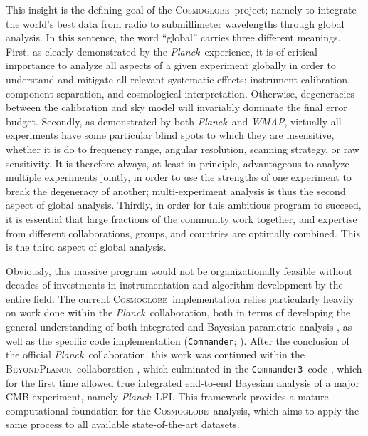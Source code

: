 \documentclass[twocolumn]{../../common/aa}
\def\WMAP{\emph{WMAP}}
\def\Planck{\emph{Planck}}
\def\commanderthree{\texttt{Commander3}}
\newcommand{\bp}{\textsc{BeyondPlanck}}
\newcommand{\cosmoglobe}{\textsc{Cosmoglobe}}
\begin{document}
This insight is the defining goal of the \cosmoglobe\ project; namely to integrate the world's best data from radio to submillimeter wavelengths through global analysis. In this sentence, the word ``global'' carries three different meanings. First, as clearly demonstrated by the \Planck\ experience, it is of critical importance to analyze all aspects of a given experiment globally in order to understand and mitigate all relevant systematic effects; instrument calibration, component separation, and cosmological interpretation. Otherwise, degeneracies between the calibration and sky model will invariably dominate the final error budget. Secondly, as demonstrated by both \Planck\ and \WMAP, virtually all experiments have some particular blind spots to which they are insensitive, whether it is do to frequency range, angular resolution, scanning strategy, or raw sensitivity. It is therefore always, at least in principle, advantageous to analyze multiple experiments jointly, in order to use the strengths of one experiment to break the degeneracy of another; multi-experiment analysis is thus the second aspect of global analysis. Thirdly, in order for this ambitious program to succeed, it is essential that large fractions of the community work together, and expertise from different collaborations, groups, and countries are optimally combined. This is the third aspect of global analysis.

Obviously, this massive program would not be organizationally feasible without decades of investments in instrumentation and algorithm development by the entire field. The current \cosmoglobe\ implementation relies particularly heavily on work done within the \Planck\ collaboration, both in terms of developing the general understanding of both integrated and Bayesian parametric analysis \citep[e.g.,][]{planck2014-a12,planck2016-l02,npipe}, as well as the specific code implementation (\texttt{Commander}; \citep{eriksen:2004,eriksen:2008}). After the conclusion of the official \Planck\ collaboration, this work was continued within the \bp\ collaboration \citep{bp01}, which culminated in the \commanderthree\ code \citep{bp03}, which for the first time allowed true integrated end-to-end Bayesian analysis of a major CMB experiment, namely \Planck\ LFI. This framework provides a mature computational foundation for the \cosmoglobe\ analysis, which aims to apply the same process to all available state-of-the-art datasets.
\end{document}
